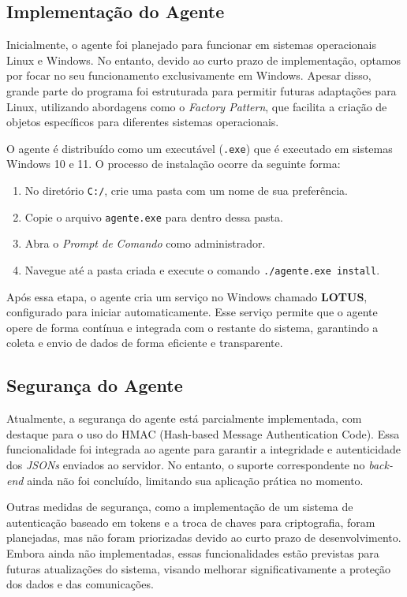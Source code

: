 \subsection{Implementação do Agente}

Inicialmente, o agente foi planejado para funcionar em sistemas operacionais Linux e Windows. No entanto, devido ao curto prazo de implementação, optamos por focar no seu funcionamento exclusivamente em Windows. Apesar disso, grande parte do programa foi estruturada para permitir futuras adaptações para Linux, utilizando abordagens como o \textit{Factory Pattern}, que facilita a criação de objetos específicos para diferentes sistemas operacionais.

O agente é distribuído como um executável (\texttt{.exe}) que é executado em sistemas Windows 10 e 11. O processo de instalação ocorre da seguinte forma:

\begin{enumerate}
    \item No diretório \texttt{C:/}, crie uma pasta com um nome de sua preferência.
    \item Copie o arquivo \texttt{agente.exe} para dentro dessa pasta.
    \item Abra o \textit{Prompt de Comando} como administrador.
    \item Navegue até a pasta criada e execute o comando \texttt{./agente.exe install}.
\end{enumerate}

Após essa etapa, o agente cria um serviço no Windows chamado \textbf{LOTUS}, configurado para iniciar automaticamente. Esse serviço permite que o agente opere de forma contínua e integrada com o restante do sistema, garantindo a coleta e envio de dados de forma eficiente e transparente.

\subsection{Segurança do Agente}

Atualmente, a segurança do agente está parcialmente implementada, com destaque para o uso do HMAC (Hash-based Message Authentication Code). Essa funcionalidade foi integrada ao agente para garantir a integridade e autenticidade dos \textit{JSONs} enviados ao servidor. No entanto, o suporte correspondente no \textit{back-end} ainda não foi concluído, limitando sua aplicação prática no momento.

Outras medidas de segurança, como a implementação de um sistema de autenticação baseado em tokens e a troca de chaves para criptografia, foram planejadas, mas não foram priorizadas devido ao curto prazo de desenvolvimento. Embora ainda não implementadas, essas funcionalidades estão previstas para futuras atualizações do sistema, visando melhorar significativamente a proteção dos dados e das comunicações.

